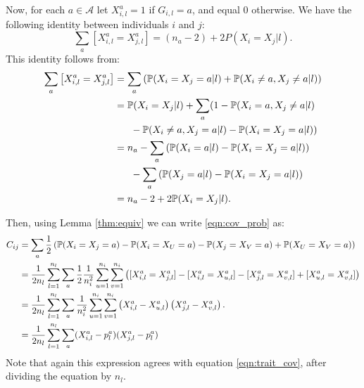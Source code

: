 Now, for each $a \in \mathcal{A}$ let $X^a_{i,l} = 1$ if $G_{i,l} = a$,
and equal 0 otherwise.
%
We have the following identity between individuals $i$ and $j$:
%
\[ \sum_a [X^a_{i,l} = X^a_{j,l}] = \left(n_a - 2\right) + 2 P\left(X_i = X_j|l\right). \]
%
This identity follows from:
%
$$
\begin{aligned}
\sum_a \left[X^a_{i,l} = X^a_{j,l}\right]
    &= \sum_a \left(\P(X_i = X_j = a|l) + \P(X_i \neq a, X_j \neq a|l) \right) \\
    &= \P(X_i = X_j|l) + \sum_a ( 1 - \P(X_i = a, X_j \neq a|l) \\ 
    &~~~~~ - \P(X_i \neq a, X_j = a|l) - \P(X_i = X_j = a|l) ) \\
    &= n_a - \sum_a \left( \P(X_i = a|l) - \P(X_i = X_j = a|l) \right) \\ 
    &~~~~~ - \sum_a \left( \P(X_j = a|l) - \P(X_i = X_j = a|l) \right) \\
    &= n_a - 2 + 2\P(X_i = X_j|l).
\end{aligned}
$$

Then, using Lemma \ref{thm:equiv} we can write \eqref{eqn:cov_prob} as:
%
$$
\begin{aligned}
C_{ij} 
    &=
    \sum_a \frac{1}{2}\left(\P(X_i = X_j = a) - \P(X_i = X_U = a) - \P(X_j = X_V = a) + \P(X_U = X_V = a) \right) \\
    &= \frac{1}{2n_l} \sum_{l=1}^{n_l} \sum_a
        \frac{1}{2}\frac{1}{n_i^2} \sum_{u=1}^{n_i} \sum_{v=1}^{n_i}
         \left( [X^a_{i,l} = X^a_{j,l}] - [X^a_{i,l} = X^a_{u,l}] - 
         [X^a_{j,l} = X^a_{v,l}] + [X^a_{u,l} = X^a_{v,l}] \right) \\
    &= \frac{1}{2n_l} \sum_{l=1}^{n_l} \sum_a
        \frac{1}{n_i^2} \sum_{u=1}^{n_i} \sum_{v=1}^{n_i}
         \left(X^a_{i,l} - X^a_{u,l}\right)
         \left(X^a_{j,l} - X^a_{v,l}\right). \label{eqn:compute_C} \\
    &= \frac{1}{2n_l} \sum_{l=1}^{n_l} \sum_a (X_{i,l}^a - p_l^a)(X_{j,l}^a - p_l^a)
\end{aligned}
$$
%
Note that again this expression agrees with equation \eqref{eqn:trait_cov},
after dividing the equation by $n_l$.



